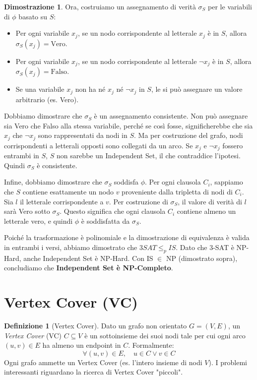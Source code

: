 \documentclass[a4paper]{article}
\theoremstyle{definition} %
\newtheorem{definition}{Definizione}[section]
\theoremstyle{definition} %
\newtheorem*{proof*}{Dimostrazione}
\begin{document}
\begin{proof*}
Ora, costruiamo un assegnamento di verità $\sigma_S$ per le variabili di $\phi$ basato su $S$:
\begin{itemize}
    \item Per ogni variabile $x_j$, se un nodo corrispondente al letterale $x_j$ è in $S$, allora $\sigma_S(x_j) = \text{Vero}$.
    \item Per ogni variabile $x_j$, se un nodo corrispondente al letterale $\neg x_j$ è in $S$, allora $\sigma_S(x_j) = \text{Falso}$.
    \item Se una variabile $x_j$ non ha né $x_j$ né $\neg x_j$ in $S$, le si può assegnare un valore arbitrario (es. Vero).
\end{itemize}
Dobbiamo dimostrare che $\sigma_S$ è un assegnamento consistente. Non può assegnare sia Vero che Falso alla stessa variabile, perché se così fosse, significherebbe che sia $x_j$ che $\neg x_j$ sono rappresentati da nodi in $S$. Ma per costruzione del grafo, nodi corrispondenti a letterali opposti sono collegati da un arco. Se $x_j$ e $\neg x_j$ fossero entrambi in $S$, $S$ non sarebbe un Independent Set, il che contraddice l'ipotesi. Quindi $\sigma_S$ è consistente.

Infine, dobbiamo dimostrare che $\sigma_S$ soddisfa $\phi$.
Per ogni clausola $C_i$, sappiamo che $S$ contiene esattamente un nodo $v$ proveniente dalla tripletta di nodi di $C_i$. Sia $l$ il letterale corrispondente a $v$. Per costruzione di $\sigma_S$, il valore di verità di $l$ sarà Vero sotto $\sigma_S$. Questo significa che ogni clausola $C_i$ contiene almeno un letterale vero, e quindi $\phi$ è soddisfatta da $\sigma_S$.

Poiché la trasformazione è polinomiale e la dimostrazione di equivalenza è valida in entrambi i versi, abbiamo dimostrato che $3SAT \le_p IS$. Dato che 3-SAT è NP-Hard, anche Independent Set è NP-Hard. Con IS $\in$ NP (dimostrato sopra), concludiamo che \textbf{Independent Set è NP-Completo}.
\end{proof*}

\section{Vertex Cover (VC)}

\begin{definition}[Vertex Cover]
Dato un grafo non orientato $G=(V, E)$, un \emph{Vertex Cover} (VC) $C \subseteq V$ è un sottoinsieme dei suoi nodi tale per cui ogni arco $(u,v) \in E$ ha almeno un endpoint in $C$. Formalmente:
\[ \forall (u, v) \in E, \quad u \in C \lor v \in C \]
Ogni grafo ammette un Vertex Cover (es. l'intero insieme di nodi $V$). I problemi interessanti riguardano la ricerca di Vertex Cover "piccoli".
\end{definition}
\end{document}
